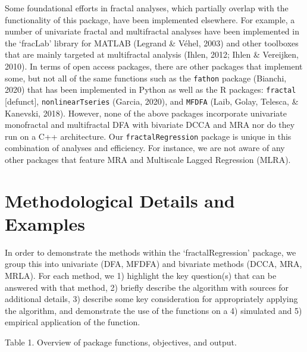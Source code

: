 \documentclass[
  english,
  man]{apa6}
\begin{document}
Some foundational efforts in fractal analyses, which partially overlap
with the functionality of this package, have been implemented elsewhere.
For example, a number of univariate fractal and multifractal analyses
have been implemented in the `fracLab' library for MATLAB (Legrand \& Véhel, 2003)
and other toolboxes that are mainly targeted at multifractal analysis
(Ihlen, 2012; Ihlen \& Vereijken, 2010). In terms of
open access packages, there are other packages that implement some, but
not all of the same functions such as the \texttt{fathon} package
(Bianchi, 2020) that has been implemented in Python as well as the R
packages: \texttt{fractal} {[}defunct{]}, \texttt{nonlinearTseries}
(Garcia, 2020), and \texttt{MFDFA}
(Laib, Golay, Telesca, \& Kanevski, 2018). However, none of the above packages
incorporate univariate monofractal and multifractal DFA with bivariate
DCCA and MRA nor do they run on a C++ architecture. Our
\texttt{fractalRegression} package is unique in this combination of analyses
and efficiency. For instance, we are not aware of any other packages
that feature MRA and Multiscale Lagged Regression (MLRA).

\hypertarget{methodological-details-and-examples}{%
\section{Methodological Details and Examples}\label{methodological-details-and-examples}}

In order to demonstrate the methods within the `fractalRegression'
package, we group this into univariate (DFA, MFDFA) and bivariate
methods (DCCA, MRA, MRLA). For each method, we 1) highlight the key
question(s) that can be answered with that method, 2) briefly describe
the algorithm with sources for additional details, 3) describe some key
consideration for appropriately applying the algorithm, and demonstrate
the use of the functions on a 4) simulated and 5) empirical application
of the function.

Table 1. Overview of package functions, objectives, and output.
\end{document}
